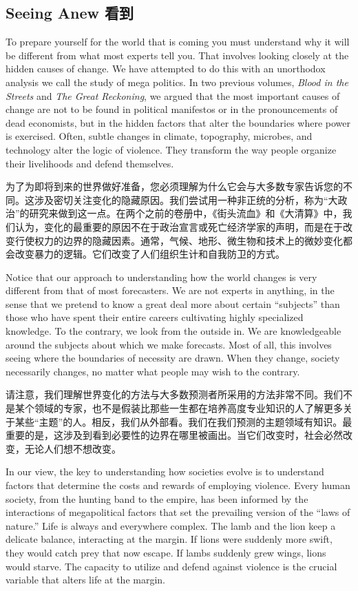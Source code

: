 \subsection{Seeing Anew 看到}
\begin{paracol}{2}
	To prepare yourself for the world that is coming you must understand why it will be different from what most experts tell you. That involves looking closely at the hidden causes of change. We have attempted to do this with an unorthodox analysis we call the study of mega politics. In two previous volumes, \emph{Blood in the Streets} and \emph{The Great Reckoning}, we argued that the most important causes of change are not to be found in political manifestos or in the pronouncements of dead economists, but in the hidden factors that alter the boundaries where power is exercised. Often, subtle changes in climate, topography, microbes, and technology alter the logic of violence. They transform the way people organize their livelihoods and defend themselves.
	
	\switchcolumn
	为了为即将到来的世界做好准备，您必须理解为什么它会与大多数专家告诉您的不同。这涉及密切关注变化的隐藏原因。我们尝试用一种非正统的分析，称为“大政治”的研究来做到这一点。在两个之前的卷册中，《街头流血》和《大清算》中，我们认为，变化的最重要的原因不在于政治宣言或死亡经济学家的声明，而是在于改变行使权力的边界的隐藏因素。通常，气候、地形、微生物和技术上的微妙变化都会改变暴力的逻辑。它们改变了人们组织生计和自我防卫的方式。
	
	
	\switchcolumn*
	Notice that our approach to understanding how the world changes is very different from that of most forecasters. We are not experts in anything, in the sense that we pretend to know a great deal more about certain ``subjects'' than those who have spent their entire careers cultivating highly specialized knowledge. To the contrary, we look from the outside in. We are knowledgeable around the subjects about which we make forecasts. Most of all, this involves seeing where the boundaries of necessity are drawn. When they change, society necessarily changes, no matter what people may wish to the contrary. 
	
	\switchcolumn
	请注意，我们理解世界变化的方法与大多数预测者所采用的方法非常不同。我们不是某个领域的专家，也不是假装比那些一生都在培养高度专业知识的人了解更多关于某些“主题”的人。相反，我们从外部看。我们在我们预测的主题领域有知识。最重要的是，这涉及到看到必要性的边界在哪里被画出。当它们改变时，社会必然改变，无论人们想不想改变。
	
	\switchcolumn*
	In our view, the key to understanding how societies evolve is to understand factors that determine the costs and rewards of employing violence. Every human society, from the hunting band to the empire, has been informed by the interactions of megapolitical factors that set the prevailing version of the ``laws of nature.'' Life is always and everywhere complex. The lamb and the lion keep a delicate balance, interacting at the margin. If lions were suddenly more swift, they would catch prey that now escape. If lambs suddenly grew wings, lions would starve. The capacity to utilize and defend against violence is the crucial variable that alters life at the margin.
	

\end{paracol}
